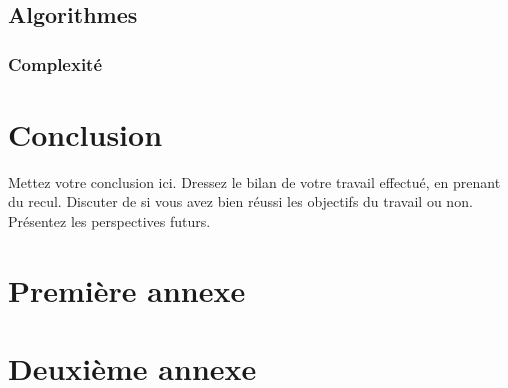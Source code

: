 \documentclass[12pt,a4paper,oneside,titlepage]{report}
\begin{document}
\section{Algorithmes}
\subsection{Complexité}







\chapter*{Conclusion}
\renewcommand{\leftmark}{CONCLUSION}

Mettez votre conclusion ici.  Dressez le bilan de votre travail effectué, en prenant du recul. Discuter de si vous avez bien réussi les objectifs du travail ou non. Présentez les perspectives futurs.

\newpage




\newpage
\appendix
{}

\chapter{Premi\`ere annexe}
\renewcommand{\leftmark}{ANNEXE \thechapter.~~Premi\`ere annexe}
\label{annexe1}

\chapter{Deuxi\`eme annexe}
\renewcommand{\leftmark}{ANNEXE \thechapter.~~Deuxi\`eme annexe}
\label{annexe2}

\end{document}
